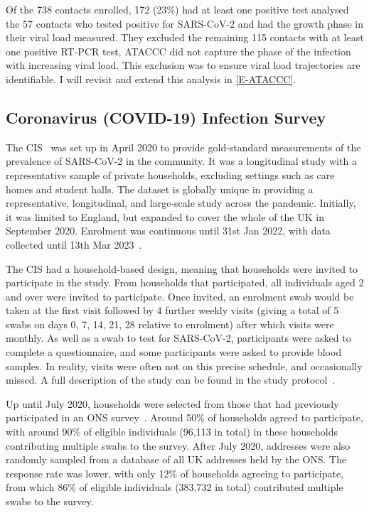 \documentclass[thesis.tex]{subfiles}
\begin{document}
Of the 738 contacts enrolled, 172 (23\%) had at least one positive test
\Textcite{hakkiOnset} analysed the 57 contacts who tested positive for SARS-CoV-2 and had the growth phase in their viral load measured.
They excluded the remaining 115 contacts with at least one positive RT-PCR test, ATACCC did not capture the phase of the infection with increasing viral load.
This exclusion was to ensure viral load trajectories are identifiable.
I will revisit and extend this analysis in \cref{E-ATACCC}.

\subsection{Coronavirus (COVID-19) Infection Survey} \label{intro:sec:cis}

The CIS~\autocite{CIS} was set up in April 2020 to provide gold-standard measurements of the prevalence of SARS-CoV-2 in the community.
It was a longitudinal study with a representative sample of private households, \ie excluding settings such as care homes and student halls.
The dataset is globally unique in providing a representative, longitudinal, and large-scale study across the pandemic.
Initially, it was limited to England, but expanded to cover the whole of the UK in September 2020.
Enrolment was continuous until 31st Jan 2022, with data collected until 13th Mar 2023~\autocite{weiRisk}. 

The CIS had a household-based design, meaning that households were invited to participate in the study.
From households that participated, all individuals aged 2 and over were invited to participate.
Once invited, an enrolment swab would be taken at the first visit followed by 4 further weekly visits (giving a total of 5 swabs on days 0, 7, 14, 21, 28 relative to enrolment) after which visits were monthly.
As well as a swab to test for SARS-CoV-2, participants were asked to complete a questionnaire, and some participants were asked to provide blood samples.
In reality, visits were often not on this precise schedule, and occasionally missed.
A full description of the study can be found in the study protocol~\autocite{cisProtocol}.

Up until July 2020, households were selected from those that had previously participated in an ONS survey~\autocite{CIStechData}.
Around 50\% of households agreed to participate, with around 90\% of eligible individuals (96,113 in total) in these households contributing multiple swabs to the survey.
After July 2020, addresses were also randomly sampled from a database of all UK addresses held by the ONS.
The response rate was lower, with only 12\% of households agreeing to participate, from which 86\% of eligible individuals (383,732 in total) contributed multiple swabs to the survey.
\end{document}
